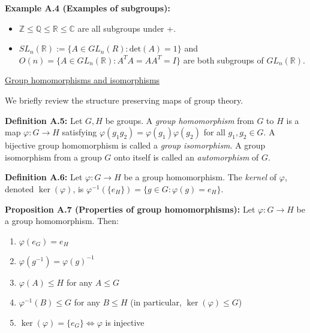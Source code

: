 \documentclass[12pt]{article}
\newcommand{\vs}{\vskip10pt}
\begin{document}
	\vs 
	
	\textbf{Example A.4 (Examples of subgroups): } 
	
	\begin{itemize}
		\item $\mathbb{Z} \leq \mathbb{Q} \leq \mathbb{R} \leq \mathbb{C}$ are all subgroups under +.
		\item $SL_n(\mathbb{R}) := \{A \in GL_n(R) : \text{det}(A) = 1\}$ and $O(n) = \{A \in GL_n(\mathbb{R}) : A^T A = A A^T = I\}$ are both subgroups of $GL_n(\mathbb{R})$.
	\end{itemize}
	
	\vs 
	
	\underline{Group homomorphisms and isomorphisms}
	
	\vs
	
	We briefly review the structure preserving maps of group theory. 
	
	\vs
	
	\textbf{Definition A.5: } Let $G,H$ be groups. A \textit{group homomorphism} from $G$ to $H$ is a map $\varphi: G \rightarrow H$ satisfying $\varphi(g_1g_2) = \varphi(g_1)\varphi(g_2)$ for all $g_1, g_2 \in G$. A bijective group homomorphism is called a \textit{group isomorphism}. A group isomorphism from a group $G$ onto itself is called an \textit{automorphism} of $G$.
	
	\vs 
	
	\textbf{Definition A.6: } Let $\varphi: G \rightarrow H$ be a group homomorphism. The \textit{kernel} of $\varphi$, denoted $\ker(\varphi)$, is $\varphi^{-1} (\{e_H\}) = \{g \in G : \varphi(g) = e_H\}$.
	
	\vs 
	
	\textbf{Proposition A.7 (Properties of group homomorphisms): } Let $\varphi: G \rightarrow H$ be a group homomorphism. Then:
	
	\begin{enumerate} [label = (\alph*)]
		\item $\varphi(e_G) = e_H$
		\item $\varphi(g^{-1}) = \varphi(g)^{-1}$
		\item $\varphi(A) \leq H$ for any $A \leq G$
		\item $\varphi^{-1}(B) \leq G$ for any $B \leq H$ (in particular, $\ker(\varphi) \leq G$)
		\item $\ker(\varphi) = \{e_G\} \iff \varphi$ is injective
	\end{enumerate}
	
\end{document}
